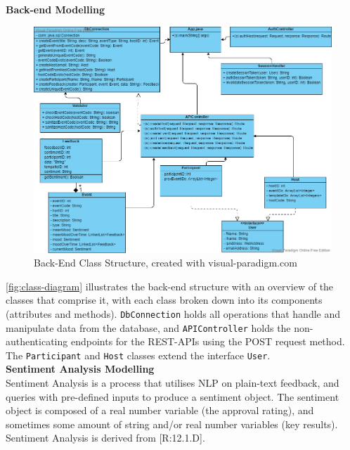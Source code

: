 \documentclass[9pt, titlepage]{extarticle}
\begin{document}
\textbf{Back-end Modelling} \label{back-comp-model}

\begin{figure}[h]
 \centering
 \includegraphics[width=\textwidth]{assets/be-classes.png}
 \caption{Back-End Class Structure, created with visual-paradigm.com \autocite{vp}}
 \label{fig:class-diagram}
\end{figure}
 
\autoref{fig:class-diagram} illustrates the back-end structure with an overview of the classes that comprise it, with each class broken down into its components (attributes and methods). \texttt{DbConnection} holds all operations that handle and manipulate data from the database, and \texttt{APIController} holds the non-authenticating endpoints for the REST-APIs using the POST request method. The \texttt{Participant} and \texttt{Host} classes extend the interface \texttt{User}.\\

\textbf{Sentiment Analysis Modelling}\\
Sentiment Analysis is a process that utilises NLP on plain-text feedback, and queries with pre-defined inputs to produce a sentiment object. The sentiment object is composed of a real number variable (the approval rating), and sometimes some amount of string and/or real number variables (key results). Sentiment Analysis is derived from [R:12.1.D]. \newline
\end{document}

